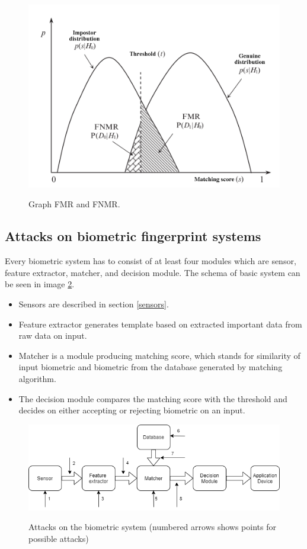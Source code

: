\begin{figure}[H]
    \centering
        {\includegraphics[width=0.7\linewidth]{obrazky-figures/fmr.png}}\\
        \caption{Graph FMR and FNMR. \cite{maltoni2009handbook}}
        \label{fig:fmr}
\end{figure}

\subsection{Attacks on biometric fingerprint systems}
Every biometric system has to consist of at least four modules which are sensor, feature extractor, matcher, and decision module. \cite{1262027} The schema of basic system can be seen in image \ref{fig:attack}. 

\begin{itemize}
	\item Sensors are described in section \ref{sensors}. 
	\item Feature extractor generates template based on extracted important data from raw data on input.
	\item Matcher is a module producing matching score, which stands for similarity of input biometric and biometric from the database generated by matching algorithm.
	\item The decision module compares the matching score with the threshold and decides on either accepting or rejecting biometric on an input.  
\end{itemize}\cite{1262027}

\begin{figure}[H]
    \centering
        {\includegraphics[width=\linewidth]{obrazky-figures/attack.png}}\\
        \caption{Attacks on the biometric system (numbered arrows shows points for possible attacks)}
        \label{fig:attack}
\end{figure}

